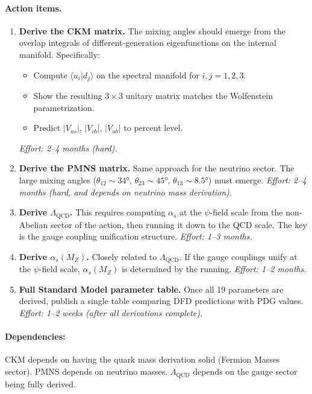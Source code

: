 \documentclass[11pt,a4paper]{article}
\begin{document}
\paragraph{Action items.}
\begin{enumerate}
    \item \textbf{Derive the CKM matrix.} The mixing angles should emerge from the overlap integrals of different-generation eigenfunctions on the internal manifold. Specifically:
    \begin{itemize}
        \item Compute $\langle u_i | d_j \rangle$ on the spectral manifold for $i,j = 1,2,3$.
        \item Show the resulting $3\times3$ unitary matrix matches the Wolfenstein parametrization.
        \item Predict $|V_{us}|$, $|V_{cb}|$, $|V_{ub}|$ to percent level.
    \end{itemize}
    \emph{Effort: 2--4 months (hard).}
    \item \textbf{Derive the PMNS matrix.} Same approach for the neutrino sector. The large mixing angles ($\theta_{12} \sim 34°$, $\theta_{23} \sim 45°$, $\theta_{13} \sim 8.5°$) must emerge. \emph{Effort: 2--4 months (hard, and depends on neutrino mass derivation).}
    \item \textbf{Derive $\Lambda_{\text{QCD}}$.} This requires computing $\alpha_s$ at the $\psi$-field scale from the non-Abelian sector of the action, then running it down to the QCD scale. The key is the gauge coupling unification structure. \emph{Effort: 1--3 months.}
    \item \textbf{Derive $\alpha_s(M_Z)$.} Closely related to $\Lambda_{\text{QCD}}$. If the gauge couplings unify at the $\psi$-field scale, $\alpha_s(M_Z)$ is determined by the running. \emph{Effort: 1--2 months.}
    \item \textbf{Full Standard Model parameter table.} Once all 19 parameters are derived, publish a single table comparing DFD predictions with PDG values. \emph{Effort: 1--2 weeks (after all derivations complete).}
\end{enumerate}

\paragraph{Dependencies:} CKM depends on having the quark mass derivation solid (Fermion Masses sector). PMNS depends on neutrino masses. $\Lambda_{\text{QCD}}$ depends on the gauge sector being fully derived.
\end{document}
